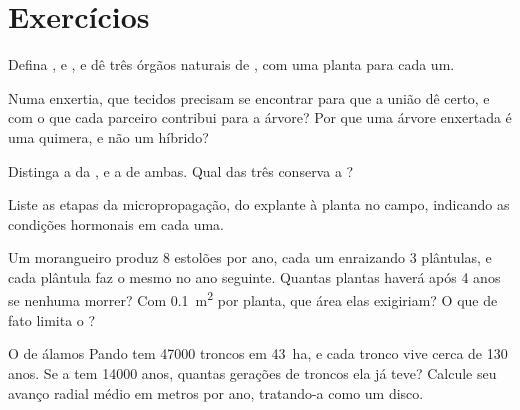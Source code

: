 \section{Exercícios}

\begin{exercise}[$\star$]\label{exo:b2:asexual-reproduction:1}
Defina ,  e , e dê três órgãos naturais de
, com uma planta para cada um.
\end{exercise}

\begin{exercise}[$\star$]\label{exo:b2:asexual-reproduction:2}
Numa enxertia, que tecidos precisam se encontrar para que a união dê
certo, e com o que cada parceiro contribui para a árvore? Por que uma
árvore enxertada é uma quimera, e não um híbrido?
\end{exercise}

\begin{exercise}[$\star$]\label{exo:b2:asexual-reproduction:3}
Distinga a  da , e a  de
ambas. Qual das três conserva a ?
\end{exercise}

\begin{exercise}[$\star$]\label{exo:b2:asexual-reproduction:4}
Liste as etapas da micropropagação, do explante à planta no campo,
indicando as condições hormonais em cada uma.
\end{exercise}

\begin{exercise}[$\star\star$]\label{exo:b2:asexual-reproduction:5}
Um morangueiro produz 8 estolões por ano, cada um enraizando 3
plântulas, e cada plântula faz o mesmo no ano seguinte. Quantas plantas
haverá após 4 anos se nenhuma morrer? Com \qty{0.1}{m^2} por planta,
que área elas exigiriam? O que de fato limita o ?
\end{exercise}

\begin{exercise}[$\star\star$]\label{exo:b2:asexual-reproduction:6}
O  de álamos Pando tem \num{47000} troncos em \qty{43}{ha}, e
cada tronco vive cerca de \num{130} anos. Se a  tem \num{14000}
anos, quantas gerações de troncos ela já teve? Calcule seu avanço
radial médio em metros por ano, tratando-a como um disco.
\end{exercise}

